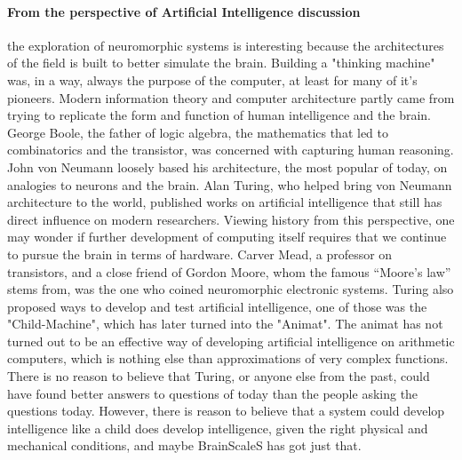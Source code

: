 \paragraph{From the perspective of Artificial Intelligence discussion} the exploration of neuromorphic systems is interesting because the architectures of the field is built to better simulate the brain.
Building a "thinking machine" was, in a way, always the purpose of the computer, at least for many of it's pioneers.
Modern information theory and computer architecture partly came from trying to replicate the form and function of human intelligence and the brain.
George Boole, the father of logic algebra, the mathematics that led to combinatorics and the transistor, was concerned with capturing human reasoning.
John von Neumann loosely based his architecture, the most popular of today, on analogies to neurons and the brain.
Alan Turing, who helped bring von Neumann architecture to the world, published works on artificial intelligence that still has direct influence on modern researchers.
Viewing history from this perspective, one may wonder if further development of computing itself requires that we continue to pursue the brain in terms of hardware.
Carver Mead, a professor on transistors, and a close friend of Gordon Moore, whom the famous ``Moore's law'' stems from, was the one who coined neuromorphic electronic systems.
Turing also proposed ways to develop and test artificial intelligence, one of those was the "Child-Machine", which has later turned into the "Animat".
The animat has not turned out to be an effective way of developing artificial intelligence on arithmetic computers, which is nothing else than approximations of very complex functions.
There is no reason to believe that Turing, or anyone else from the past, could have found better answers to questions of today than the people asking the questions today.
However, there is reason to believe that a system could develop intelligence like a child does develop intelligence, given the right physical and mechanical conditions, and maybe BrainScaleS has got just that.








